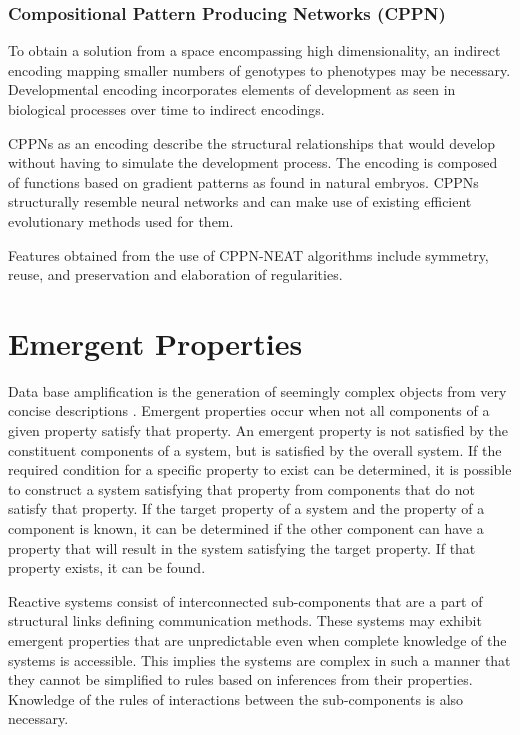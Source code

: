 \subsubsection{Compositional Pattern Producing Networks (CPPN)}

To obtain a solution from a space encompassing high dimensionality, an indirect encoding mapping smaller numbers of genotypes to phenotypes may be necessary. Developmental encoding incorporates elements of development as seen in biological processes over time to indirect encodings. \cite{Hornby2001}

CPPNs as an encoding describe the structural relationships that would develop without having to simulate the development process. The encoding is composed of functions based on gradient patterns as found in natural embryos. CPPNs structurally resemble neural networks and can make use of existing efficient evolutionary methods used for them. \cite{Stanley2006}

Features obtained from the use of CPPN-NEAT algorithms include symmetry, reuse, and preservation and elaboration of regularities. \cite{Stanley2006}

\section{Emergent Properties}

Data base amplification is the generation of seemingly complex objects from very concise descriptions \cite{Prusinkiewicz2004}. Emergent properties occur when not all components of a given property satisfy that property. An emergent property is not satisfied by the constituent components of a system, but is satisfied by the overall system. If the required condition for a specific property to exist can be determined, it is possible to construct a system satisfying that property from components that do not satisfy that property. If the target property of a system and the property of a component is known, it can be determined if the other component can have a property that will result in the system satisfying the target property. If that property exists, it can be found. \cite{Zakinthinos1998}

Reactive systems consist of interconnected sub-components that are a part of structural links defining communication methods. These systems may exhibit emergent properties that are unpredictable even when complete knowledge of the systems is accessible. This implies the systems are complex in such a manner that they cannot be simplified to rules based on inferences from their properties. Knowledge of the rules of interactions between the sub-components is also necessary. \cite{Aiguier2008}

